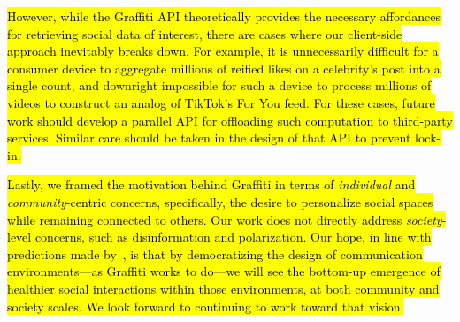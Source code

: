 \hl{%
However, while the Graffiti API theoretically provides the necessary
affordances for retrieving social data of interest,
there are cases where our client-side approach inevitably breaks down.
For example, it is unnecessarily difficult for a consumer device to
aggregate millions of reified likes on a celebrity's post into a single count, and
downright impossible for such a device to
process millions of videos to construct an analog of TikTok's For You feed.
For these cases, future work should develop
a parallel API for offloading such
computation to third-party services.
Similar care should be taken
in the design of that API to prevent lock-in.
}%

\hl{%
Lastly, we framed the motivation behind Graffiti in terms of
\emph{individual} and \emph{community}-centric concerns,
specifically, the desire to personalize social spaces while remaining connected to others.
Our work does not directly address \emph{society}-level concerns,
such as disinformation and polarization.
Our hope, in line with predictions made by~{\cite{threeleggedstool}}, is that by democratizing
the design of communication environments---as Graffiti works to do---we
will see the bottom-up emergence of healthier social interactions within those environments,
at both community and society scales.
We look forward to continuing to work toward that vision.
}%
